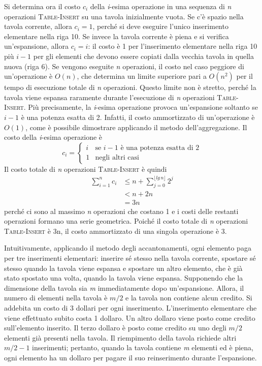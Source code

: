 \documentclass[10pt, a4paper]{report}
\begin{document}
Si determina ora il costo $c_i$ della \textit{i}-esima operazione in una sequenza di \textit{n} operazioni \textsc{Table-Insert} su una tavola inizialmente vuota. Se c'è spazio nella tavola corrente, allora $c_i = 1$, perché si deve eseguire l'unico inserimento elementare nella riga 10. Se invece la tavola corrente è piena e si verifica un'espansione, allora $c_i = i$: il costo è 1 per l'inserimento elementare nella riga 10 più $i - 1$ per gli elementi che devono essere copiati dalla vecchia tavola in quella nuova (riga 6). Se vengono eseguite \textit{n} operazioni, il costo nel caso peggiore di un'operazione è $O(n)$, che determina un limite superiore pari a $O(n^2)$ per il tempo di esecuzione totale di \textit{n} operazioni. Questo limite non è stretto, perché la tavola viene espansa raramente durante l'esecuzione di \textit{n} operazioni \textsc{Table-Insert}. Più precisamente, la \textit{i}-esima operazione provoca un'espansione soltanto se $i - 1$ è una potenza esatta di 2. Infatti, il costo ammortizzato di un'operazione è $O(1)$, come è possibile dimostrare applicando il metodo dell'aggregazione. Il costo della \textit{i}-esima operazione è
\begin{equation*}
c_i = \left\{
\begin{array}{ll}
i &\text{se } i - 1 \text{ è una potenza esatta di 2}\\
1 &\text{negli altri casi}
\end{array}\right.
\end{equation*}
Il costo totale di \textit{n} operazioni \textsc{Table-Insert} è quindi
\begin{align*}
\sum_{i=1}^{n}c_i &\leq n + \sum_{j=0}^{\lfloor lg\,n\rfloor}2^j\\
&< n + 2n\\
&= 3n
\end{align*}
perché ci sono al massimo \textit{n} operazioni che costano 1 e i costi delle restanti operazioni formano una serie geometrica. Poiché il costo totale di \textit{n} operazioni \textsc{Table-Insert} è 3n, il costo ammortizzato di una singola operazione è 3.

Intuitivamente, applicando il metodo degli accantonamenti, ogni elemento paga per tre inserimenti elementari: inserire sé stesso nella tavola corrente, spostare sé stesso quando la tavola viene espansa e spostare un altro elemento, che è già stato spostato una volta, quando la tavola viene espansa. Supponendo che la  dimensione della tavola sia \textit{m} immediatamente dopo un'espansione. Allora, il numero di elementi nella tavola è $m/2$ e la tavola non contiene alcun credito. Si addebita un costo di 3 dollari per ogni inserimento. L'inserimento elementare che viene effettuato subito costa 1 dollaro. Un altro dollaro viene posto come credito sull'elemento inserito. Il terzo dollaro è posto come credito su uno degli $m/2$ elementi già presenti nella tavola. Il riempimento della tavola richiede altri $m/2 - 1$ inserimenti; pertanto, quando la tavola contiene \textit{m} elementi ed è piena, ogni elemento ha un dollaro per pagare il suo reinserimento durante l'espansione.
\end{document}
